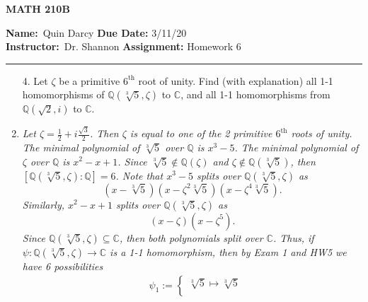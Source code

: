 \documentclass[12pt]{article}
\makeatletter
\theoremstyle{definition}
\theoremstyle{remark}
\newenvironment{solution}[1][\bf{\textit{Solution}}]{\par
  
  \normalfont \topsep6\p@\@plus6\p@\relax
  \list{}{\leftmargin=0mm
          \rightmargin=4mm
          \settowidth{\itemindent}{\itshape#1}%
          \labelwidth=\itemindent
          \parsep=0pt \listparindent=\parindent 
  }
  \item[\hskip\labelsep
        \itshape
    #1\@addpunct{.}]\ignorespaces
}{%
  \popQED\endlist\@endpefalse
}
\makeatother
\begin{document}
\thispagestyle{empty}\hline

\begin{center}
	\vspace{.4cm} {\textbf { \large MATH 210B}}
\end{center}
{\textbf{Name:}\ Quin Darcy \hspace{\fill} \textbf{Due Date:} 3/11/20   \\
{ \textbf{Instructor:}}\ Dr. Shannon \hspace{\fill} \textbf{Assignment:} Homework 6 \\ \hrule}

\justifying

    \begin{enumerate}[leftmargin=*]
        \item[4.] Let $\zeta$ be a primitive $6^{\text{th}}$ root of unity. Find (with explanation) all 1-1 homomorphisms of $\mathbb{Q}(\sqrt[3]{5},\zeta)$ to $\mathbb{C}$, and all 1-1 homomorphisms from $\mathbb{Q}(\sqrt{2},i)$ to $\mathbb{C}$.
            \begin{solution}
                \emph{Let $\zeta=\frac{1}{2}+i\frac{\sqrt{3}}{2}$. Then $\zeta$ is equal to one of the 2 primitive $6^{\text{th}}$ roots of unity. The minimal polynomial of $\sqrt[3]{5}$ over $\mathbb{Q}$ is $x^3-5$. The minimal polynomial of $\zeta$ over $\mathbb{Q}$ is $x^2-x+1$. Since $\sqrt[3]{5}\notin\mathbb{Q}(\zeta)$ and $\zeta\notin\mathbb{Q}(\sqrt[3]{5})$, then $[\mathbb{Q}(\sqrt[3]{5},\zeta)\colon\mathbb{Q}]=6$. Note that $x^3-5$ splits over $\mathbb{Q}(\sqrt[3]{5},\zeta)$ as
                    \begin{equation*}
                        (x-\sqrt[3]{5})(x-\zeta^2\sqrt[3]{5})(x-\zeta^4\sqrt[3]{5}).
                    \end{equation*}
                Similarly, $x^2-x+1$ splits over $\mathbb{Q}(\sqrt[3]{5},\zeta)$ as 
                    \begin{equation*}
                        (x-\zeta)(x-\zeta^5).
                    \end{equation*}
                Since $\mathbb{Q}(\sqrt[3]{5},\zeta)\subseteq\mathbb{C}$, then both polynomials split over $\mathbb{C}$. Thus, if $\psi\colon\mathbb{Q}(\sqrt[3]{5},\zeta)\rightarrow\mathbb{C}$ is a 1-1 homomorphism, then by Exam 1 and HW5 we have 6 possibilities
                    \begin{align*}
                        &\psi_1:=\begin{cases} 
                            \sqrt[3]{5}\mapsto\sqrt[3]{5}\\

\end{cases}
\end{align*}}
\end{solution}
\end{enumerate}
\end{document}
